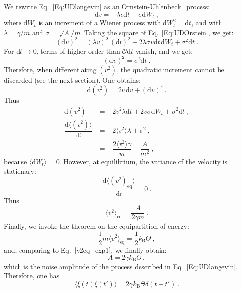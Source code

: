 We rewrite Eq.~\ref{Eq:UDlangevin} as an Ornstein-Uhlenbeck~\cite{UhlenbeckOrnstein1930} process:
\begin{equation}
    \mathrm{d}v = - \lambda v \mathrm{d}t + \sigma \mathrm{d}W_t~,
    \label{Eq:UDOrstein}
\end{equation}
where $\mathrm{d}W_t$ is an increment of a Wiener process with $\mathrm{d}W_t^2 = \mathrm{d}t$, and with $\lambda = \gamma / m$ and $\sigma = \sqrt{A}/m$. Taking the square of Eq.~\ref{Eq:UDOrstein}, we get:
\begin{equation}
    \left(\mathrm{d}v\right)^2 = \left(\lambda v\right)^2\, (\mathrm{d}t)^2 - 2 \lambda \sigma v \mathrm{d}t \, \mathrm{d}W_t + \sigma^2 \mathrm{d}t~.
\end{equation}
For $\mathrm{d}t \to 0$, terms of higher order than $\mathcal{O}\mathrm{d}t$ vanish, and we get:
\begin{equation}
    \boxed{
    \left(\mathrm{d}v\right)^2 = \sigma^2 \mathrm{d}t~.}
    \label{Eq:(dv)^2}
\end{equation}
Therefore, when differentiating $(v^2)$, the quadratic increment cannot be discarded (see the next section). One obtains:
\begin{equation}
\mathrm{d}(v^2)=2v\,\mathrm{d}v+(\mathrm{d}v)^2~.
\end{equation}
Thus,
\begin{equation}
\begin{aligned}
    \mathrm{d}\left(v^2\right) &= -2v^2 \lambda \mathrm{d}t + 2v\sigma \mathrm{d}W_t + \sigma^2 \mathrm{d}t~,\\
    \dfrac{\mathrm{d}\langle\left(v^2\right)\rangle}{\mathrm{d}t} &= -2\langle v^2 \rangle \lambda  + \sigma^2~,\\
    & = -\dfrac{2 \langle v^2 \rangle \gamma}{m} + \dfrac{A}{m^2}~,
\end{aligned}
\end{equation}
because $\langle \mathrm{d}W_t \rangle = 0$. However, at equilibrium, the variance of the velocity is stationary: 
\begin{equation}
    \dfrac{\mathrm{d}\langle\left(v^2\right)_\mathrm{eq}\rangle}{\mathrm{d}t} = 0~.
\end{equation}
Thus, 
\begin{equation}
    \langle v^2 \rangle_\mathrm{eq} = \dfrac{A}{2 \gamma m}~.
    \label{v2eq_exp1}
\end{equation}
Finally, we invoke the theorem on the equipartition of energy:
\begin{equation}
    \boxed{\dfrac{1}{2} m \langle v^2\rangle_\mathrm{eq} = \dfrac{1}{2} k_\mathrm{B}\Theta}~,
\end{equation}
and, comparing to Eq.~\ref{v2eq_exp1}, we finally obtain:
\begin{equation}
    A = 2 \gamma k_\mathrm{B}\Theta~,
\end{equation}
which is the noise amplitude of the process described in Eq.~\ref{Eq:UDlangevin}. Therefore, one has:
\begin{equation}
    \langle \xi(t)\xi(t') \rangle = 2 \gamma k_\mathrm{B}\Theta \delta(t-t')~.
\end{equation}

